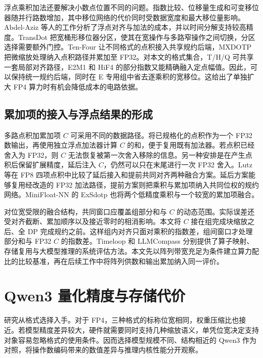 \documentclass[10.5pt,compsoc,UTF8]{CjC}
\begin{document}
浮点乘积加法还要解决小数点位置不同的问题。指数比较、位移量生成和可变移位器随并行路数增加，其中移位网络的代价同时受数据宽度和最大移位量影响。Abdel-Aziz 等人的工作分析了浮点对齐与加法的成本，并以时间分解支持较高精度\cite{abdelaziz2021overheads}。TransDot 把宽桶形移位器分区，使其在宽操作与多路窄操作之间切换，分区选择需要额外门控。Ten-Four 让不同格式的点积接入共享规约后端，MXDOTP 把微缩放处理纳入点积路径并累加至 FP32\cite{tenfour,islamoglu2025mxdotp}。对本文的格式集合，T/H/Q 可共享一套局部对齐路径，E2M1 和 HiF4 的部分指数又能精确融入定点幅值。因此，可以保持统一规约后端，同时在 E 专用组中省去逐乘积的宽移位。这给出了单独扩大 FP4 算力时有机会降低成本的电路依据。

\subsection{累加项的接入与浮点结果的形成}

多路点积加累加项 $C$ 可采用不同的数据路径。将已规格化的点积作为一个 FP32 数输出，再使用独立浮点加法器计算 $C$ 的和，便于复用既有加法器。若点积已经舍入为 FP32，则 $C$ 无法恢复被第一次舍入移除的信息。另一种安排是在产生点积后保留扩展精度，延后注入 $C$，仍然可以只在末尾进行一次 FP32 舍入。Lutz 等在 FP8 四项点积中比较了延后接入和提前共同对齐两种融合方案。延后方案能够复用经改造的 FP32 加法路径，提前方案则把乘积与累加项纳入共同位权的规约网络\cite{lutz2024fused}。MiniFloat-NN 的 ExSdotp 也将两个低精度乘积与一个较宽的累加项融合\cite{bertaccini2022minifloat}。

对位宽受限的融合结构，共同窗口应覆盖组部分和与 $C$ 的动态范围。实际误差还受对齐截断、累加顺序以及接近零时的相消影响\cite{sun2023tensorcores,xie2025mmasim,tensorgauge}。本文将 $C$ 接在组完成块缩放之后、全 DP 完成规约之前。这样组内对齐只面对乘积的指数差，组间窗口才处理部分和与 FP32 $C$ 的指数差。Timeloop 和 LLMCompass 分别提供了算子映射、存储复用与大模型推理的系统评估方法\cite{timeloop2019,llmcompass}。本文先以阵列带宽充足为条件建立算力配比的比较基准，再在后续工作中将阵列供数和输出累加纳入同一评价。

\section{Qwen3 量化精度与存储代价}
\label{sec:quant}

研究从格式选择入手。对于 FP4，三种格式的标称位宽相同，权重压缩比也接近。若模型精度差异较大，硬件就需要同时支持几种缩放语义，单凭位宽决定支持对象容易忽略格式的使用条件。因而选择模型规模不同、结构相近的 Qwen3 作为对照，将操作数编码带来的数值差异与推理内核性能分开观察。
\end{document}
